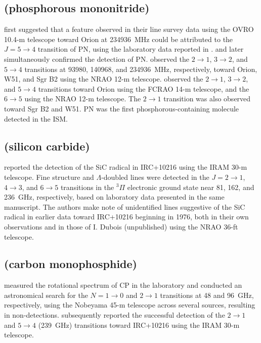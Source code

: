 \documentclass[twocolumn]{aastex631}
\begin{document}
    \subsection{ (phosphorous mononitride)}
    \label{PN}
    
    \citet{Sutton:1985vs} first suggested that a feature observed in their line survey data using the OVRO 10.4-m telescope toward Orion at 234936~MHz could be attributed to the $J = 5\rightarrow4$ transition of PN, using the laboratory data reported in \citet{Wyse:1972go}.  \citet{Turner:1987fg} and \citet{Ziurys:1987vx} later simultaneously confirmed the detection of PN.  \citet{Turner:1987fg} observed the $2\rightarrow1$, $3\rightarrow2$, and $5\rightarrow4$ transitions at 93980, 140968, and 234936~MHz, respectively, toward Orion, W51, and Sgr B2 using the NRAO 12-m telescope. \citet{Ziurys:1987vx} observed the  $2\rightarrow1$, $3\rightarrow2$, and $5\rightarrow4$ transitions toward Orion using the FCRAO 14-m telescope, and the $6\rightarrow5$ using the NRAO 12-m telescope.  The $2\rightarrow1$ transition was also observed toward Sgr B2 and W51.  PN was the first phosphorous-containing molecule detected in the ISM.
    
    \subsection{ (silicon carbide)}
    \label{SiC}
    
    \citet{Cernicharo:1989mw} reported the detection of the SiC radical in IRC+10216 using the IRAM 30-m telescope.  Fine structure and $\Lambda$-doubled lines were detected in the $J = 2\rightarrow1$, $4\rightarrow3$, and $6\rightarrow5$ transitions in the $^3\Pi$ electronic ground state near 81, 162, and 236~GHz, respectively, based on laboratory data presented in the same manuscript.  The authors make note of unidentified lines suggestive of the SiC radical in earlier data toward IRC+10216 beginning in 1976, both in their own observations and in those of I. Dubois (unpublished) using the NRAO 36-ft telescope.
    
    \subsection{ (carbon monophosphide)}
    \label{CP}
    
    \citet{Saito:1989wp} measured the rotational spectrum of CP in the laboratory and conducted an astronomical search for the $N = 1\rightarrow0$ and $2\rightarrow1$ transitions at 48 and 96~GHz, respectively, using the Nobeyama 45-m telescope across several sources, resulting in non-detections.  \citet{Guelin:1990iw} subsequently reported the successful detection of the $2\rightarrow1$ and $5\rightarrow4$ (239~GHz) transitions toward IRC+10216 using the IRAM 30-m telescope.
    
\end{document}
